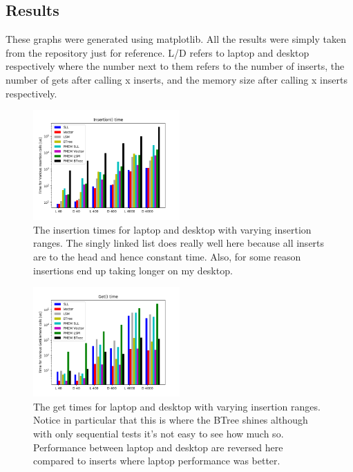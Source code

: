 \documentclass[twocolumn]{article}
\begin{document}
\subsection{Results}

These graphs were generated using matplotlib. All the results were simply taken
from the repository just for reference. L/D refers to laptop and desktop
respectively where the number next to them refers to the number of inserts, the
number of gets after calling x inserts, and the memory size after calling x
inserts respectively.

\begin{figure}[H]
  \centering
  \includegraphics[width=0.5\textwidth]{insertion_times}
  \caption{The insertion times for laptop and desktop with varying insertion
  ranges. The singly linked list does really well here because all inserts are
to the head and hence constant time. Also, for some reason insertions end up
taking longer on my desktop.}
\end{figure}

\begin{figure}[H]
  \centering
  \includegraphics[width=0.5\textwidth]{get_times}
  \caption{The get times for laptop and desktop with varying insertion
  ranges. Notice in particular that this is where the BTree shines although with
only sequential tests it's not easy to see how much so. Performance between
laptop and desktop are reversed here compared to inserts where laptop
performance was better.}
\end{figure}
\end{document}
